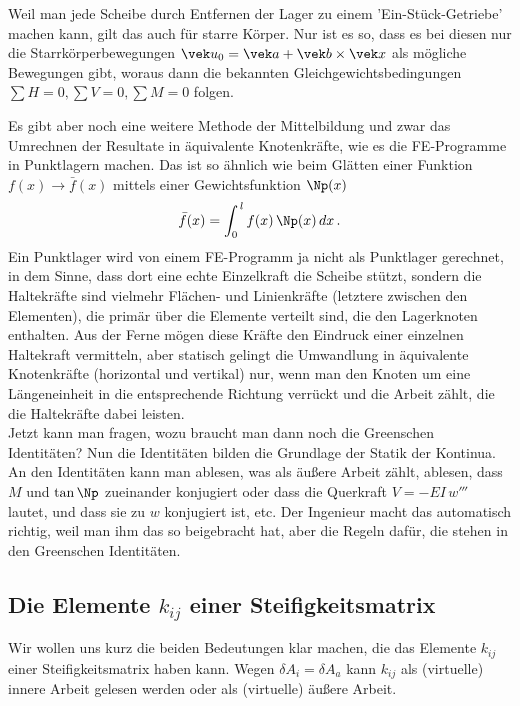 {{{{\begin{remark}
Weil man jede Scheibe durch Entfernen der Lager zu einem 'Ein-St\"{u}ck-Getriebe' machen kann, gilt das auch f\"{u}r starre K\"{o}rper. Nur ist es so, dass es bei diesen nur die Starrk\"{o}rperbewegungen $\vek u_0 = \vek a + \vek b \times \vek x$ als m\"{o}gliche Bewegungen gibt, woraus dann die bekannten Gleichgewichtsbedingungen  $\sum H = 0, \sum V = 0, \sum M = 0$ folgen.
\end{remark}


Es gibt aber noch eine weitere Methode der Mittelbildung und zwar das Umrechnen der Resultate in \"{a}quivalente Knotenkr\"{a}fte, wie es die FE-Programme in Punktlagern machen. Das ist so \"{a}hnlich wie beim Gl\"{a}tten einer Funktion $f(x) \to \bar{f}(x)$ mittels einer Gewichtsfunktion $\Np(x)$
\begin{align}
\bar{f}(x) = \int_0^{\,l} f(x)\,\Np(x)\,dx\,.
\end{align}
Ein Punktlager wird von einem FE-Programm ja nicht als Punktlager gerechnet, in dem Sinne, dass dort eine echte Einzelkraft die Scheibe st\"{u}tzt, sondern die Haltekr\"{a}fte sind vielmehr Fl\"{a}chen- und Linienkr\"{a}fte (letztere zwischen den Elementen), die prim\"{a}r \"{u}ber die Elemente verteilt sind, die den Lagerknoten enthalten. Aus der Ferne m\"{o}gen diese Kr\"{a}fte den Eindruck einer einzelnen Haltekraft vermitteln, aber statisch gelingt die Umwandlung in \"{a}quivalente Knotenkr\"{a}fte (horizontal und vertikal) nur, wenn man den Knoten um eine L\"{a}ngeneinheit in die entsprechende Richtung verr\"{u}ckt und die Arbeit z\"{a}hlt, die die Haltekr\"{a}fte dabei leisten.\\

Jetzt kann man fragen, wozu braucht man dann noch die Greenschen Identit\"{a}ten? Nun die Identit\"{a}ten bilden die Grundlage der Statik der Kontinua. An den Identit\"{a}ten kann man ablesen, was als \"{a}u{\ss}ere Arbeit z\"{a}hlt, ablesen, dass $M$ und $\tan \Np$ zueinander konjugiert oder dass die Querkraft $ V = - EI\,w'''$ lautet, und dass sie zu $w$ konjugiert ist, etc. Der Ingenieur macht das automatisch richtig, weil man ihm das so beigebracht hat, aber die Regeln daf\"{u}r, die stehen in den Greenschen Identit\"{a}ten.
\\

{\textcolor{blau2}{\section{Die Elemente $k_{ij}$ einer Steifigkeitsmatrix}}}
Wir wollen uns kurz die beiden Bedeutungen klar machen, die das Elemente $k_{ij}$ einer Steifigkeitsmatrix haben kann. Wegen $\delta A_i = \delta A_a$ kann $k_{ij}$ als (virtuelle) innere Arbeit gelesen werden oder als (virtuelle) \"{a}u{\ss}ere Arbeit.

}}}}
